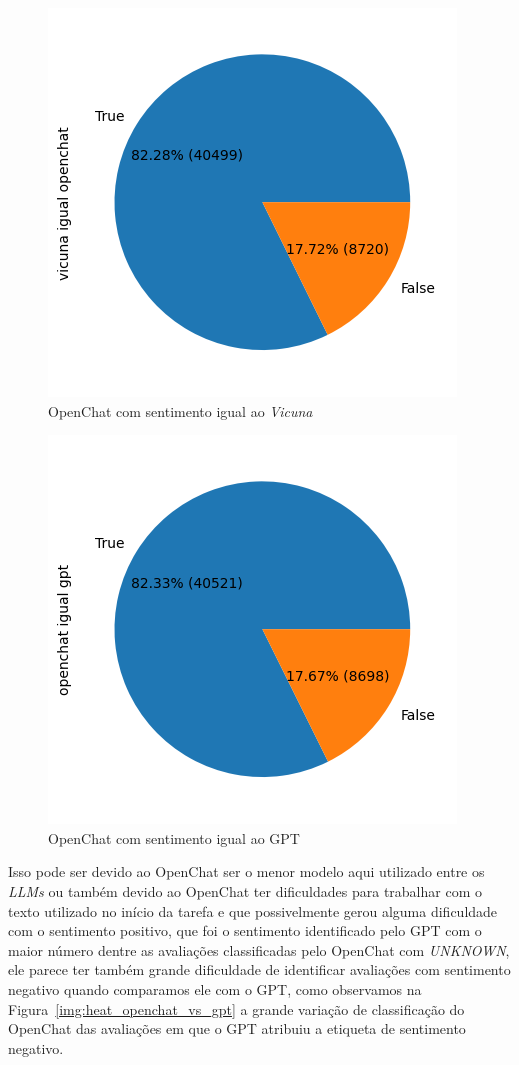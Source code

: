 \begin{figure}
	\centering
	\includegraphics{figs/openchat/vs_vicuna.png}
	\caption{OpenChat com sentimento igual ao \textit{Vicuna}}
	\label{img:openchat_vs_vicuna}
\end{figure}

\begin{figure}
	\centering
	\includegraphics{figs/openchat/vs_gpt.png}
	\caption{OpenChat com sentimento igual ao GPT}
	\label{img:openchat_vs_gpt}
\end{figure}

Isso pode ser devido ao OpenChat ser o menor modelo aqui utilizado entre os \textit{LLMs} ou também devido ao OpenChat ter dificuldades para trabalhar com o texto utilizado no início da tarefa e que possivelmente gerou alguma dificuldade com o sentimento positivo, que foi o sentimento identificado pelo GPT com o maior número dentre as avaliações classificadas pelo OpenChat com \textit{UNKNOWN}, ele parece ter também grande dificuldade de identificar avaliações com sentimento negativo quando comparamos ele com o GPT, como observamos na Figura~\ref{img:heat_openchat_vs_gpt} a grande variação de classificação do OpenChat das avaliações em que o GPT atribuiu a etiqueta de sentimento negativo.

